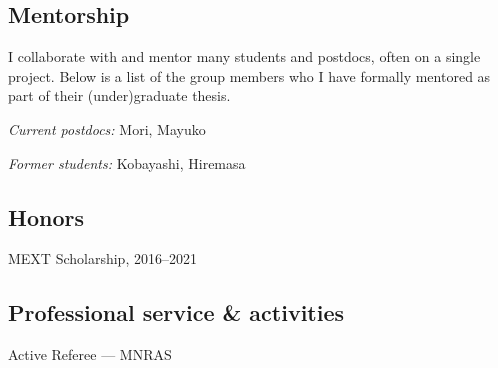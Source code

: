 \documentclass[12pt,letterpaper]{article}
\begin{document}
\fi

\subsection{Mentorship}

I collaborate with and mentor many students and postdocs, often on a single
project.
Below is a list of the group members who I have formally mentored as part of their (under)graduate thesis.

\begin{list}{}{\cvlist}
\item \emph{Current postdocs:}
  Mori, Mayuko
\item \emph{Former students:}
  Kobayashi, Hiremasa
\end{list}




\subsection{Honors}
\begin{list}{}{\cvlist}

  \item MEXT Scholarship, 2016--2021

\end{list}


\subsection{Professional service \& activities}
\begin{list}{}{\cvlist}
  \item Active Referee ---
        MNRAS
\end{list}
\end{document}
